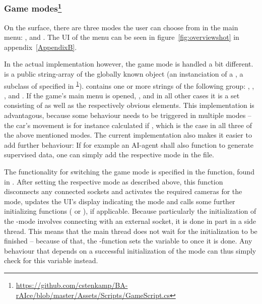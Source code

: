 \subsubsection{Game modes\footnote{\label{gamescript}\url{https://github.com/cstenkamp/BA-rAIce/blob/master/Assets/Scripts/GameScript.cs}}}

On the surface, there are three modes the user can choose from in the main menu: ,  and . The UI of the menu can be seen in figure~\ref{fig:overviewshot} in appendix~\ref{AppendixB}. 

In the actual implementation however, the game mode is handled a bit different.  is a public string-array of the globally known object  (an instanciation of a , a subclass of  specified in \textsuperscript{\ref{gamescript}}).  contains one or more strings of the following group: , , ,  and . If the game's main menu is opened, , and in all other cases it is a set consisting of  as well as the respectively obvious elements. This implementation is advantagous, because some behaviour needs to be triggered in multiple modes -- the car's movement is for instance calculated if , which is the case in all three of the above mentioned modes. The current implementation also makes it easier to add further behaviour: If for example an AI-agent shall also function to generate supervised data, one can simply add the respective mode in the  file.

The functionality for switching the game mode is specified in the  function, found in . After setting the respective mode as described above, this function disconnects any connected sockets and  activates the required cameras for the mode, updates the UI's display indicating the mode and calls some further initializing functions ( or ), if applicable. Because particularly the initialization of the -mode involves connecting with an external socket, it is done in part in a side thread. This means that the main thread does not wait for the initialization to be finished -- because of that, the -function sets the variable  to  once it is done. Any behaviour that depends on a successful initialization of the mode can thus simply check for this variable instead.

